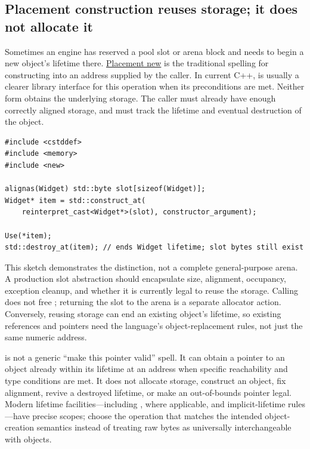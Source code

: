\subsection{Placement construction reuses storage; it does not allocate it}\label{01-foundations-i-ch004-placement-construction-reuses-storage-it-does-not-allocate-it}

\hypertarget{01-foundations-i-ch004-placement-construction-reuses-storage-it-does-not-allocate-it}{}

Sometimes an engine has reserved a pool slot or arena block and needs to begin a new object's lifetime there. \hyperref[appendix-f56c3e43fd4e]{Placement new} is the traditional spelling for constructing into an address supplied by the caller. In current C++,  is usually a clearer library interface for this operation when its preconditions are met. Neither form obtains the underlying storage. The caller must already have enough correctly aligned storage, and must track the lifetime and eventual destruction of the object.

\begin{verbatim}
#include <cstddef>
#include <memory>
#include <new>

alignas(Widget) std::byte slot[sizeof(Widget)];
Widget* item = std::construct_at(
    reinterpret_cast<Widget*>(slot), constructor_argument);

Use(*item);
std::destroy_at(item); // ends Widget lifetime; slot bytes still exist
\end{verbatim}

This sketch demonstrates the distinction, not a complete general-purpose arena. A production slot abstraction should encapsulate size, alignment, occupancy, exception cleanup, and whether it is currently legal to reuse the storage. Calling  does not free ; returning the slot to the arena is a separate allocator action. Conversely, reusing storage can end an existing object's lifetime, so existing references and pointers need the language's object-replacement rules, not just the same numeric address.

 is not a generic ``make this pointer valid'' spell. It can obtain a pointer to an object already within its lifetime at an address when specific reachability and type conditions are met. It does not allocate storage, construct an object, fix alignment, revive a destroyed lifetime, or make an out-of-bounds pointer legal. Modern lifetime facilities---including ,  where applicable, and implicit-lifetime rules---have precise scopes; choose the operation that matches the intended object-creation semantics instead of treating raw bytes as universally interchangeable with objects.

